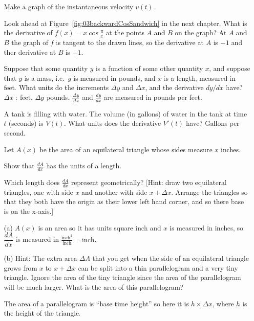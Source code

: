 \begin{multicols}{2}
\subprob Make a graph of the instantaneous velocity $v(t)$.



\problem Look ahead at Figure~\ref{fig:03backwardCosSandwich} in the next
chapter.  What is the derivative of $f(x) = x\cos\frac\pi x$ at the
points $A$ and $B$ on the graph?
\answer
At $A$ and $B$ the graph of $f$ is tangent to the drawn lines, so
the derivative at $A$ is $-1$ and ther derivative at $B$ is $+1$.
\endanswer

\problem Suppose that some quantity $y$ is a function of some other quantity
$x$, and suppose that $y$ is a mass, i.e.\ $y$ is measured in pounds,
and $x$ is a length, measured in feet.  What units do the increments
$\Delta y$ and $\Delta x$, and the derivative $ dy/d x$ have?
\answer
$\Delta x$ : feet.  $\Delta y$ pounds. $\frac{\Delta y}{\Delta x}$
and $\frac{dy}{dx}$ are measured in pounds per feet.
\endanswer


\problem A tank is filling with water.  The volume (in gallons) of water in
the tank at time $t$ (seconds) is $V(t)$.  What units does the
derivative $V'(t)$ have?
\answer
Gallons per second.
\endanswer


\problem \groupproblem Let $A(x)$ be the area of an equilateral triangle whose sides measure
$x$ inches.

\subprob Show that $\frac{dA}{dx}$ has the units of a length.

\subprob Which length does $\frac{dA}{dx}$ represent
geometrically?  [Hint: draw two equilateral triangles, one with side
$x$ and another with side $x+\Delta x$.  Arrange the triangles so
that they both have the origin as their lower left hand corner, and
so there base is on the x-axis.]

\answer
(a) $A(x)$ is an area so it has units square inch and $x$ is
measured in inches, so $\dfrac{dA}{dx}$ is measured in
$\displaystyle\frac{\text{inch}^2}{\text{inch}} = \text{inch}$.




(b) Hint: The extra area $\Delta A$ that you get when the side of
an equilateral triangle grows from $x$ to $x+\Delta x$ can be
split into a thin parallelogram and a very tiny triangle.  Ignore
the area of the tiny triangle since the area of the parallelogram
will be much larger.  What is the area of this parallelogram?

The area of a parallelogram is ``base time height'' so here it is
$h\times\Delta x$, where $h$ is the height of the triangle.


\end{multicols}
